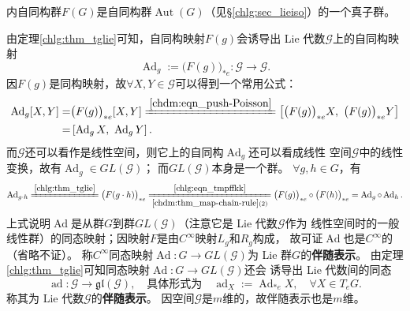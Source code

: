 内自同构群$F(G)$是自同构群$\operatorname{Aut}(G)$（见\S\ref{chlg:sec_lieiso}）的一个真子群。

由定理\ref{chlg:thm_tglie}可知，自同构映射$F(g)$会诱导出 Lie 代数$\mathscr{G}$上的自同构映射
\begin{equation}
  \operatorname{Ad}_{g} := \bigl(F(g)\bigr)_{*e} : \mathscr{G}  \to \mathscr{G} .
\end{equation}
因$F(g)$是同构映射，故$\forall X, Y \in \mathscr{G}$可以得到一个常用公式：
\begin{equation}
    \begin{aligned}
    \operatorname{Ad}_{g}[X, Y] =& \bigl(F(g)\bigr)_{*e} [X,Y]  \xlongequal{\ref{chdm:eqn_push-Poisson}}
    \left[ \bigl(F(g)\bigr)_{*e} X,\  \bigl(F(g)\bigr)_{*e} Y\right] \\
    =&\left[ \operatorname{Ad}_{g} X,\  \operatorname{Ad}_{g} Y\right] .
    \end{aligned}
\end{equation}
而$\mathscr{G}$还可以看作是线性空间，则它上的自同构$\operatorname{Ad}_{g}$还可以看成线性
空间$\mathscr{G}$中的线性变换，故有$\operatorname{Ad}_{g}\in GL(\mathscr{G})$；
而$GL(\mathscr{G})$本身是一个群。
$\forall g,h \in G$，有
\begin{equation}
    \operatorname{Ad}_{g\cdot h}    \xlongequal{\ref{chlg:thm_tglie}}
    \bigl(F(g\cdot h)\bigr)_{*e}
    \xlongequal[\ref{chdm:thm_map-chain-rule}(2)]{\ref{chlg:eqn_tmpffkk}}
    \bigl(F(g)\bigr)_{*e}\circ \bigl(F(h)\bigr)_{*e}
    =\operatorname{Ad}_{g} \circ \operatorname{Ad}_{h} .
\end{equation}
上式说明$\operatorname{Ad}$是从群$G$到群$GL(\mathscr{G})$（注意它是 Lie 代数$\mathscr{G}$作为
线性空间时的一般线性群）的同态映射；因映射$F$是由$C^\infty$映射$L_g$和$R_g$构成，
故可证$\operatorname{Ad}$也是$C^\infty$的（省略不证）。
称$C^\infty$同态映射$\operatorname{Ad}:{G}\to GL(\mathscr{G})$为 Lie 群$G$的\textbf{伴随表示}。
由定理\ref{chlg:thm_tglie}可知同态映射$\operatorname{Ad}:G\to GL(\mathscr{G})$还会
诱导出 Lie 代数间的同态
\begin{equation}
    \operatorname{ad}:\mathscr{G}\to \mathfrak{gl}(\mathscr{G}),\quad \text{具体形式为}\quad
    \operatorname{ad}_{X} := \operatorname{Ad}_{*e} X, \quad \forall X \in T_e G.
\end{equation}
称其为 Lie 代数$\mathscr{G}$的\textbf{伴随表示}。
因空间$\mathscr{G}$是$m$维的，故伴随表示也是$m$维。


